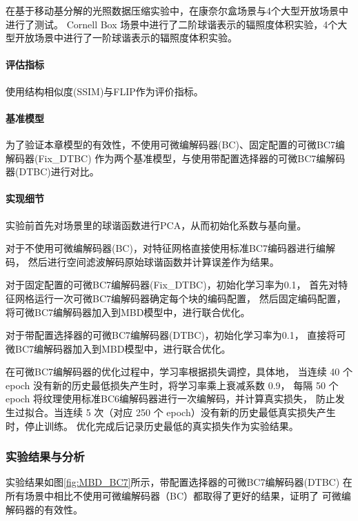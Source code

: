 在基于移动基分解的光照数据压缩实验中，在康奈尔盒场景与4个大型开放场景中进行了测试。
Cornell Box 场景中进行了二阶球谐表示的辐照度体积实验，4个大型开放场景中进行了一阶球谐表示的辐照度体积实验。

\paragraph{评估指标}

使用结构相似度(SSIM)与FLIP作为评价指标。

\paragraph{基准模型}

为了验证本章模型的有效性，不使用可微编解码器(BC)、固定配置的可微BC7编解码器(Fix\_DTBC)
作为两个基准模型，与使用带配置选择器的可微BC7编解码器(DTBC)进行对比。

\paragraph{实现细节}

实验前首先对场景里的球谐函数进行PCA，从而初始化系数与基向量。

对于不使用可微编解码器(BC)，对特征网格直接使用标准BC7编码器进行编解码，
然后进行空间滤波解码原始球谐函数并计算误差作为结果。

对于固定配置的可微BC7编解码器(Fix\_DTBC)，初始化学习率为0.1，
首先对特征网格运行一次可微BC7编解码器确定每个块的编码配置，
然后固定编码配置，将可微BC7编解码器加入到MBD模型中，进行联合优化。

对于带配置选择器的可微BC7编解码器(DTBC)，初始化学习率为0.1，
直接将可微BC7编解码器加入到MBD模型中，进行联合优化。

在可微BC7编解码器的优化过程中，学习率根据损失调控，具体地，
当连续 40 个 epoch 没有新的历史最低损失产生时，将学习率乘上衰减系数 0.9，
每隔 50 个 epoch 将纹理使用标准BC6编解码器进行一次编解码，并计算真实损失，
防止发生过拟合。当连续 5 次（对应 250 个 epoch）没有新的历史最低真实损失产生时，停止训练。
优化完成后记录历史最低的真实损失作为实验结果。

\subsubsection{实验结果与分析}

实验结果如图\ref{fig:MBD_BC7}所示，带配置选择器的可微BC7编解码器(DTBC)
在所有场景中相比不使用可微编解码器（BC）都取得了更好的结果，证明了
可微编解码器的有效性。

